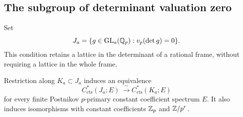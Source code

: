 \subsection{The subgroup of determinant valuation zero}

Set
\[
 J_a=\{g\in\operatorname{GL}_a(\mathbb Q_p):v_p(\det g)=0\}.
\]
This condition retains a lattice in the determinant of a rational frame,
without requiring a lattice in the whole frame.

\begin{lemma}
\label{lem:const-building}
Restriction along $K_a\subset J_a$ induces an equivalence
\[
 C^*_{\mathrm{cts}}(J_a;E)\ \xrightarrow{\ \sim\ }
 C^*_{\mathrm{cts}}(K_a;E)
\]
for every finite Postnikov $p$-primary constant coefficient spectrum $E$.
It also induces isomorphisms with constant coefficients $\mathbb Z_p$ and
$\mathbb Z/p^r$.
\end{lemma}

